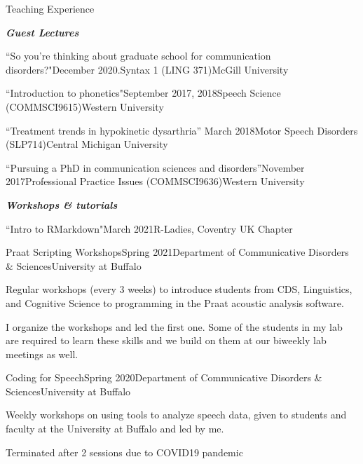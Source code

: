\documentclass{resume} %
\begin{document}
\begin{rSection}{Teaching Experience}
	
\begin{center}
	{\bf \emph{Guest Lectures}}
\end{center}

	\begin{rSubsection}{``So you're thinking about graduate school for communication disorders?"}{December 2020.}{Syntax 1 (LING 371)}{McGill University}
	\end{rSubsection}

	\begin{rSubsection}{``Introduction to phonetics"}{September 2017, 2018}{Speech Science (COMMSCI9615)}{Western University}
	\end{rSubsection}

	\begin{rSubsection}{``Treatment trends in hypokinetic dysarthria'' }{March 2018}{Motor Speech Disorders (SLP714)}{Central Michigan University}
	\end{rSubsection}
	
	\begin{rSubsection}{``Pursuing a PhD in communication sciences and disorders''}{November 2017}{Professional Practice Issues (COMMSCI9636)}{Western University}
	\end{rSubsection}

\begin{center}
		{\bf \emph{Workshops \& tutorials}}
\end{center}

	\begin{rSubsection}{``Intro to RMarkdown"}{March 2021}{R-Ladies, Coventry UK Chapter}{}
	\end{rSubsection}

	\begin{rSubsection}{Praat Scripting Workshops}{Spring 2021}{Department of Communicative Disorders \& Sciences}{University at Buffalo}
		\item Regular workshops (every 3 weeks) to introduce students from CDS, Linguistics, and Cognitive Science to programming in the Praat acoustic analysis software.
		\item I organize the workshops and led the first one. Some of the students in my lab are required to learn these skills and we build on them at our biweekly lab meetings as well.
	\end{rSubsection}

	\begin{rSubsection}{Coding for Speech}{Spring 2020}{Department of Communicative Disorders \& Sciences}{University at Buffalo}
		\item Weekly workshops on using tools to analyze speech data, given to students and faculty at the University at Buffalo and led by me.
		\item Terminated after 2 sessions due to COVID19 pandemic
	\end{rSubsection}


\end{rSection}
\end{document}
